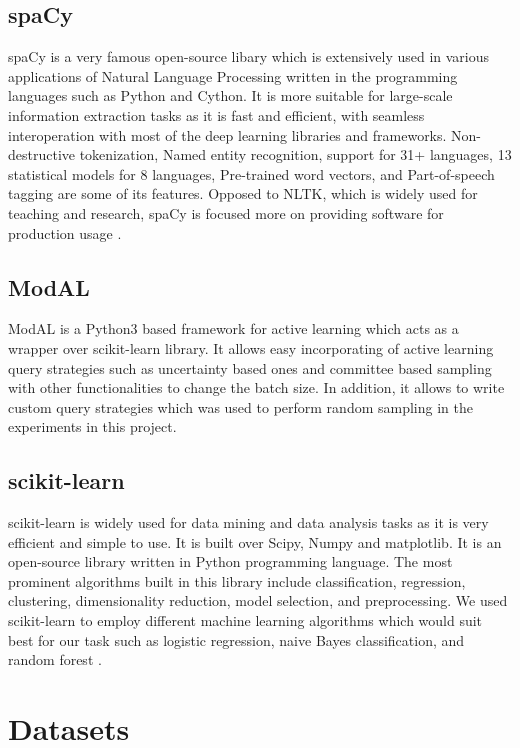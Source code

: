    \subsection{spaCy}
    
    spaCy is a very famous open-source libary which is extensively used in various applications of Natural Language Processing written in the programming languages such as Python and Cython. It is more suitable for large-scale information extraction tasks as it is fast and efficient, with seamless interoperation with most of the deep learning libraries and frameworks. Non-destructive tokenization, Named entity recognition, support for 31+ languages, 13 statistical models for 8 languages, Pre-trained word vectors, and Part-of-speech tagging are some of its features. Opposed to NLTK, which is widely used for teaching and research, spaCy is focused more on providing software for production usage \cite{spacy}.
    
    \subsection{ModAL}
    
    ModAL \cite{modAL2018} is a Python3 based framework for active learning which acts as a wrapper over scikit-learn library. It allows easy incorporating of active learning query strategies such as uncertainty based ones and committee based sampling with other functionalities to change the batch size. In addition, it allows to write custom query strategies which was used to perform random sampling in the experiments in this project. 
    
    \subsection{scikit-learn}
    
    scikit-learn is widely used for data mining and data analysis tasks as it is very efficient and simple to use. It is built over Scipy, Numpy and matplotlib. It is an open-source library written in Python programming language. The most prominent algorithms built in this library include classification, regression, clustering, dimensionality reduction, model selection, and preprocessing. We used scikit-learn to employ different machine learning algorithms which would suit best for our task such as logistic regression, naive Bayes classification, and random forest \cite{scikit_learn}. 
    
    
    \section{Datasets}
    
